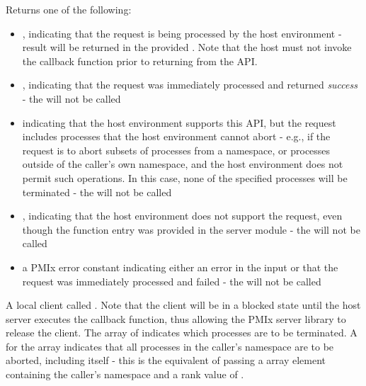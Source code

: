 Returns one of the following:

\begin{itemize}
    \item {}, indicating that the request is being processed by the host environment - result will be returned in the provided . Note that the host must not invoke the callback function prior to returning from the \ac{API}.
    \item {}, indicating that the request was immediately processed and returned \textit{success} - the  will not be called
    \item {} indicating that the host environment supports this \ac{API}, but the request includes processes that the host environment cannot abort - e.g., if the request is to abort subsets of processes from a namespace, or processes outside of the caller's own namespace, and the host environment does not permit such operations. In this case, none of the specified processes will be terminated - the  will not be called
    \item {}, indicating that the host environment does not support the request, even though the function entry was provided in the server module - the  will not be called
    \item a PMIx error constant indicating either an error in the input or that the request was immediately processed and failed - the  will not be called
\end{itemize}

\descr

A local client called .
Note that the client will be in a blocked state until the host server executes the callback function, thus allowing the \ac{PMIx} server library to release the client.
The array of  indicates which processes are to be terminated.
A  for the  array indicates that all processes in the caller's namespace are to be aborted, including itself - this is the equivalent of passing a  array element containing the caller's namespace and a rank value of .

\subsection{}

